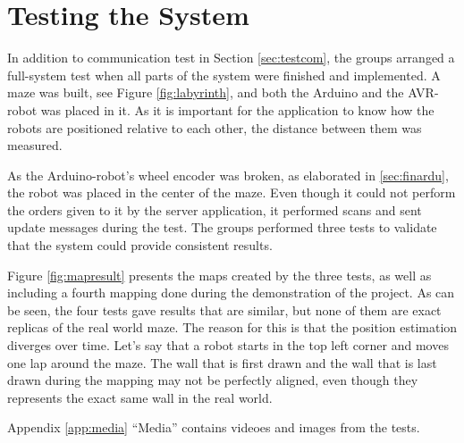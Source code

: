 \chapter{Testing the System}
In addition to communication test in Section \ref{sec:testcom}, the groups arranged a full-system test when all parts of the system were finished and implemented. A maze was built, see Figure \ref{fig:labyrinth}, and both the Arduino and the AVR-robot was placed in it. As it is important for the application to know how the robots are positioned relative to each other, the distance between them was measured.


As the Arduino-robot's wheel encoder was broken, as elaborated in \ref{sec:finardu}, the robot was placed in the center of the maze. Even though it could not perform the orders given to it by the server application, it performed scans and sent update messages during the test. The groups performed three tests to validate that the system could provide consistent results.

Figure \ref{fig:mapresult} presents the maps created by the three tests, as well as including a fourth mapping done during the demonstration of the project. As can be seen, the four tests gave results that are similar, but none of them are exact replicas of the real world maze. The reason for this is that the position estimation diverges over time. Let's say that a robot starts in the top left corner and moves one lap around the maze. The wall that is first drawn and the wall that is last drawn during the mapping may not be perfectly aligned, even though they represents the exact same wall in the real world.

Appendix \ref{app:media} ``Media'' contains videoes and images from the tests.


